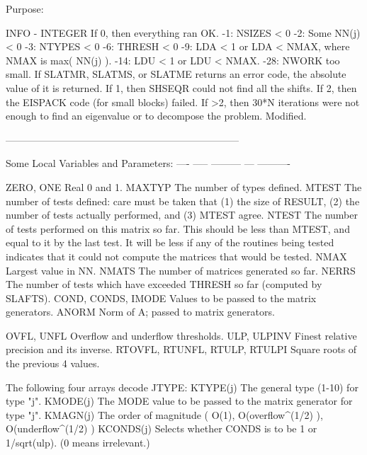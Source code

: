 \begin{DoxyParagraph}{Purpose\+: }
\begin{DoxyVerb}
  INFO   - INTEGER
           If 0, then everything ran OK.
            -1: NSIZES < 0
            -2: Some NN(j) < 0
            -3: NTYPES < 0
            -6: THRESH < 0
            -9: LDA < 1 or LDA < NMAX, where NMAX is max( NN(j) ).
           -14: LDU < 1 or LDU < NMAX.
           -28: NWORK too small.
           If  SLATMR, SLATMS, or SLATME returns an error code, the
               absolute value of it is returned.
           If 1, then SHSEQR could not find all the shifts.
           If 2, then the EISPACK code (for small blocks) failed.
           If >2, then 30*N iterations were not enough to find an
               eigenvalue or to decompose the problem.
           Modified.

-----------------------------------------------------------------------

     Some Local Variables and Parameters:
     ---- ----- --------- --- ----------

     ZERO, ONE       Real 0 and 1.
     MAXTYP          The number of types defined.
     MTEST           The number of tests defined: care must be taken
                     that (1) the size of RESULT, (2) the number of
                     tests actually performed, and (3) MTEST agree.
     NTEST           The number of tests performed on this matrix
                     so far.  This should be less than MTEST, and
                     equal to it by the last test.  It will be less
                     if any of the routines being tested indicates
                     that it could not compute the matrices that
                     would be tested.
     NMAX            Largest value in NN.
     NMATS           The number of matrices generated so far.
     NERRS           The number of tests which have exceeded THRESH
                     so far (computed by SLAFTS).
     COND, CONDS,
     IMODE           Values to be passed to the matrix generators.
     ANORM           Norm of A; passed to matrix generators.

     OVFL, UNFL      Overflow and underflow thresholds.
     ULP, ULPINV     Finest relative precision and its inverse.
     RTOVFL, RTUNFL,
     RTULP, RTULPI   Square roots of the previous 4 values.

             The following four arrays decode JTYPE:
     KTYPE(j)        The general type (1-10) for type "j".
     KMODE(j)        The MODE value to be passed to the matrix
                     generator for type "j".
     KMAGN(j)        The order of magnitude ( O(1),
                     O(overflow^(1/2) ), O(underflow^(1/2) )
     KCONDS(j)       Selects whether CONDS is to be 1 or
                     1/sqrt(ulp).  (0 means irrelevant.)\end{DoxyVerb}
 
\end{DoxyParagraph}
